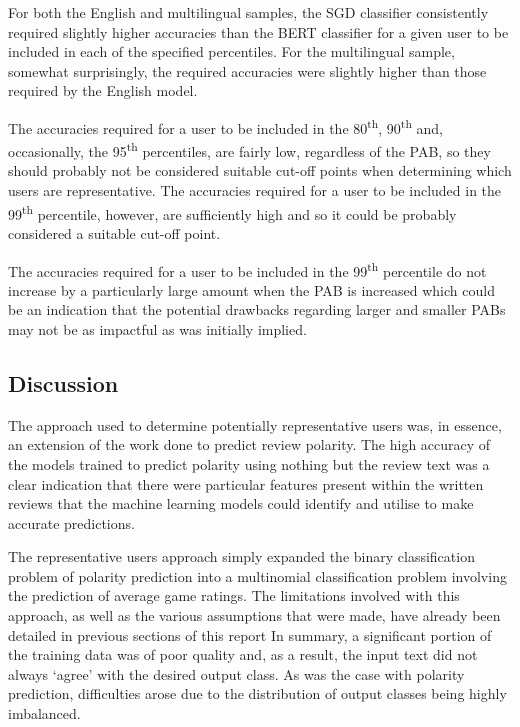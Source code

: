 For both the English and multilingual samples, the SGD classifier consistently required slightly higher accuracies than the BERT classifier for a given user to be included in each of the specified percentiles. For the multilingual sample, somewhat surprisingly, the required accuracies were slightly higher than those required by the English model.

The accuracies required for a user to be included in the 80\textsuperscript{th}, 90\textsuperscript{th} and, occasionally, the 95\textsuperscript{th} percentiles, are fairly low, regardless of the PAB, so they should probably not be considered suitable cut-off points when determining which users are representative. The accuracies required for a user to be included in the 99\textsuperscript{th} percentile, however, are sufficiently high and so it could be probably considered a suitable cut-off point.

The accuracies required for a user to be included in the 99\textsuperscript{th} percentile do not increase by a particularly large amount when the PAB is increased which could be an indication that the potential drawbacks regarding larger and smaller PABs may not be as impactful as was initially implied.

\subsection{Discussion}

The approach used to determine potentially representative users was, in essence, an extension of the work done to predict review polarity. The high accuracy of the models trained to predict polarity using nothing but the review text was a clear indication that there were particular features present within the written reviews that the machine learning models could identify and utilise to make accurate predictions.

The representative users approach simply expanded the binary classification problem of polarity prediction into a multinomial classification problem involving the prediction of average game ratings. The limitations involved with this approach, as well as the various assumptions that were made, have already been detailed in previous sections of this report In summary, a significant portion of the training data was of poor quality and, as a result, the input text did not always `agree' with the desired output class. As was the case with polarity prediction, difficulties arose due to the distribution of output classes being highly imbalanced.

